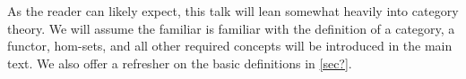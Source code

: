 As the reader can likely expect, this talk will lean somewhat heavily into category theory. We will assume the familiar is familiar with the definition of a category, a functor, hom-sets, and all other required concepts will be introduced in the main text. We also offer a refresher on the basic definitions in \cref{sec?}.
